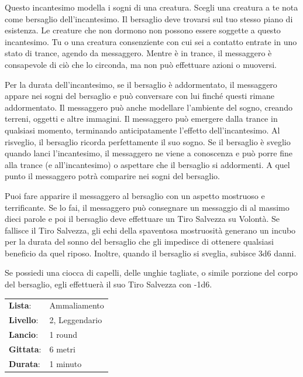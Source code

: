 \begin{multicols}{2}
Questo incantesimo modella i sogni di una creatura. Scegli una creatura a te nota come bersaglio dell'incantesimo. Il bersaglio deve trovarsi sul tuo stesso piano di esistenza. Le creature che non dormono non possono essere soggette a questo incantesimo. Tu o una creatura consenziente con cui sei a contatto entrate in uno stato di trance, agendo da messaggero. Mentre è in trance, il messaggero è consapevole di ciò che lo circonda, ma non può effettuare azioni o muoversi.

Per la durata dell'incantesimo, se il bersaglio è addormentato, il messaggero appare nei sogni del bersaglio e può conversare con lui finché questi rimane addormentato. Il messaggero può anche modellare l'ambiente del sogno, creando terreni, oggetti e altre immagini. Il messaggero può emergere dalla trance in qualsiasi momento, terminando anticipatamente l'effetto dell'incantesimo. Al risveglio, il bersaglio ricorda perfettamente il suo sogno. Se il bersaglio è sveglio quando lanci l'incantesimo, il messaggero ne viene a conoscenza e può porre fine alla trance (e all'incantesimo) o aspettare che il bersaglio si addormenti. A quel punto il messaggero potrà comparire nei sogni del bersaglio.

Puoi fare apparire il messaggero al bersaglio con un aspetto mostruoso e terrificante. Se lo fai, il messaggero può consegnare un messaggio di al massimo dieci parole e poi il bersaglio deve effettuare un Tiro Salvezza su Volontà. Se fallisce il Tiro Salvezza, gli echi della spaventosa mostruosità generano un incubo per la durata del sonno del bersaglio che gli impedisce di ottenere qualsiasi beneficio da quel riposo. Inoltre, quando il bersaglio si sveglia, subisce 3d6 danni.

Se possiedi una ciocca di capelli, delle unghie tagliate, o simile porzione del corpo del bersaglio, egli effettuerà il suo Tiro Salvezza con -1d6.

\noindent\begin{tabularx}{\linewidth}{p{1.3cm}X}
	\rowcolor{gray!20}\textbf{Lista}: & Ammaliamento \\
	\textbf{Livello}: & 2, Leggendario \\
	\rowcolor{gray!20}\textbf{Lancio}: & 1 round \\
	\textbf{Gittata}: & 6 metri \\
	\rowcolor{gray!20}\textbf{Durata}: & 1 minuto \\
\end{tabularx}\smallskip


\end{multicols}
